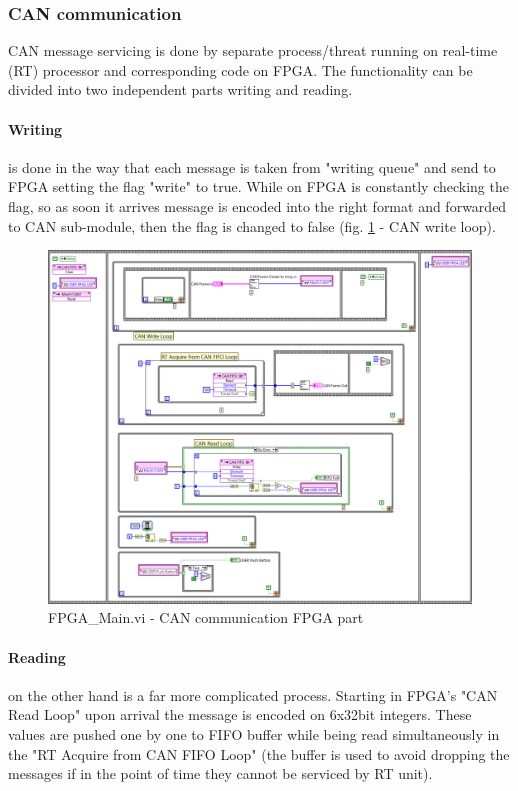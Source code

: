 \subsubsection{CAN communication}\label{CAN_communication}
CAN message servicing is done by separate process/threat running on real-time (RT) processor and corresponding code on FPGA. The functionality can be divided into two independent parts writing and reading.
\paragraph{Writing} is done in the way that each message is taken from "writing queue" and send to FPGA setting the flag "write" to true. While on FPGA is constantly checking the flag, so as soon it arrives message is encoded into the right format and forwarded to CAN sub-module, then the flag is changed to false (fig. \ref{vi:FPGA_Main} - CAN write loop).
\begin{figure}[H]
    \centering
    \includegraphics[scale=\visc,max width=\textwidth]{figures/FPGA_Maind_e}
    \caption{FPGA\_Main.vi - CAN communication FPGA part}
    \label{vi:FPGA_Main}
\end{figure}
\paragraph{Reading} on the other hand is a far more complicated process. Starting in FPGA's "CAN Read Loop" upon arrival the message is encoded on 6x32bit integers. These values are pushed one by one to FIFO buffer while being read simultaneously in the "RT Acquire from CAN FIFO Loop" (the buffer is used to avoid dropping the messages if in the point of time they cannot be serviced by RT unit).


